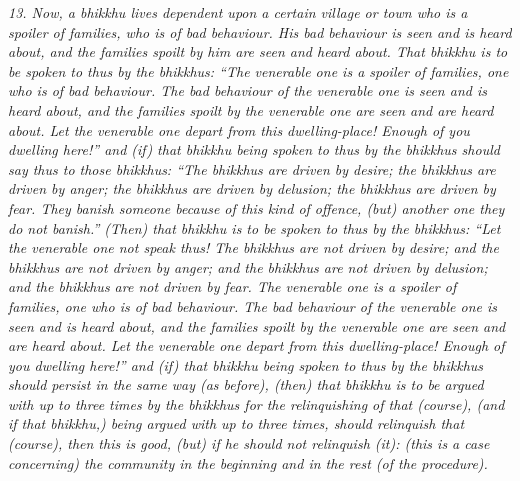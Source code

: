 \documentclass[11pt]{article}
\begin{document}
\begin{paracol}{2}
\begin{column}
{\itshape\footnotesize
13. Now, a bhikkhu lives dependent upon a certain village or town who is a spoiler of families, who is of bad behaviour. His bad behaviour is seen and is heard about, and the families spoilt by him are seen and heard about. That bhikkhu is to be spoken to thus by the bhikkhus: “The venerable one is a spoiler of families, one who is of bad behaviour. The bad behaviour of the venerable one is seen and is heard about, and the families spoilt by the venerable one are seen and are heard about. Let the venerable one depart from this dwelling-place! Enough of you dwelling here!” and (if) that bhikkhu being spoken to thus by the bhikkhus should say thus to those bhikkhus: “The bhikkhus are driven by desire; the bhikkhus are driven by anger; the bhikkhus are driven by delusion; the bhikkhus are driven by fear. They banish someone because of this kind of offence, (but) another one they do not banish.” (Then) that bhikkhu is to be spoken to thus by the bhikkhus: “Let the venerable one not speak thus! The bhikkhus are not driven by desire; and the bhikkhus are not driven by anger; and the bhikkhus are not driven by delusion; and the bhikkhus are not driven by fear. The venerable one is a spoiler of families, one who is of bad behaviour. The bad  behaviour  of  the venerable  one  is  seen and  is  heard  about,  and  the families   spoilt  by the venerable  one are seen and are heard  about.  Let  the venerable  one  depart  from  this  dwelling-place! Enough of you dwelling here!” and (if) that bhikkhu being spoken to thus by the bhikkhus should persist in the same way (as before), (then) that bhikkhu is to be argued with up to three times by the bhikkhus for the relinquishing of that (course), (and if that bhikkhu,) being argued with up to three times, should relinquish that (course), then this is good, (but) if he should not relinquish (it): (this is a case concerning) the community in the beginning and in the rest (of the procedure).
}
\switchcolumn


\end{column}
\end{paracol}
\end{document}
